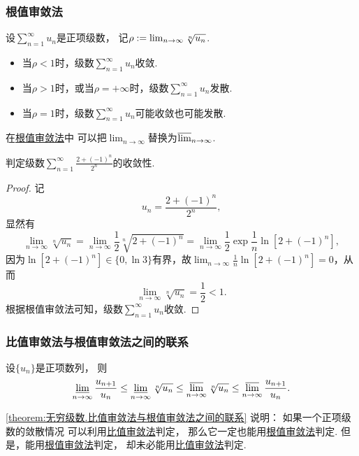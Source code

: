 \subsubsection{根值审敛法}
\begin{theorem}\label{theorem:无穷级数.正项级数的根值审敛法}
设\(\sum_{n=1}^\infty u_n\)是正项级数，
记\(\rho := \lim_{n\to\infty} \sqrt[n]{u_n}\).
\begin{itemize}
	\item 当\(\rho<1\)时，级数\(\sum_{n=1}^\infty u_n\)收敛.
	\item 当\(\rho>1\)时，或当\(\rho=+\infty\)时，级数\(\sum_{n=1}^\infty u_n\)发散.
	\item 当\(\rho=1\)时，级数\(\sum_{n=1}^\infty u_n\)可能收敛也可能发散.
\end{itemize}
\end{theorem}
在\hyperref[theorem:无穷级数.正项级数的根值审敛法]{根值审敛法}中
可以把\(\lim_{n\to\infty}\)替换为\(\varlimsup_{n\to\infty}\).

\begin{example}
判定级数\(\sum_{n=1}^\infty \frac{2+(-1)^n}{2^n}\)的收敛性.
\begin{proof}
记\[
u_n = \frac{2+(-1)^n}{2^n},
\]显然有\[
\lim_{n\to\infty} \sqrt[n]{u_n}
= \lim_{n\to\infty} \frac{1}{2} \sqrt[n]{2+(-1)^n}
= \lim_{n\to\infty} \frac{1}{2} \exp{\frac{1}{n} \ln[2+(-1)^n]},
\]因为\(\ln[2+(-1)^n] \in \{ 0, \ln3 \}\)有界，故\(\lim_{n\to\infty} \frac{1}{n} \ln[2+(-1)^n] = 0\)，从而\[
\lim_{n\to\infty} \sqrt[n]{u_n} = \frac{1}{2} < 1.
\]根据根值审敛法可知，级数\(\sum_{n=1}^\infty u_n\)收敛.
\end{proof}
\end{example}

\subsubsection{比值审敛法与根值审敛法之间的联系}
\begin{theorem}\label{theorem:无穷级数.比值审敛法与根值审敛法之间的联系}
设\(\{u_n\}\)是正项数列，
则\[
	\varliminf_{n\to\infty} \frac{u_{n+1}}{u_n}
	\leq
	\varliminf_{n\to\infty} \sqrt[n]{u_n}
	\leq
	\varlimsup_{n\to\infty} \sqrt[n]{u_n}
	\leq
	\varlimsup_{n\to\infty} \frac{u_{n+1}}{u_n}.
\]
\end{theorem}
\begin{remark}
\cref{theorem:无穷级数.比值审敛法与根值审敛法之间的联系} 说明：
如果一个正项级数的敛散情况
可以利用\hyperref[theorem:无穷级数.正项级数的比值审敛法]{比值审敛法}判定，
那么它一定也能用\hyperref[theorem:无穷级数.正项级数的根值审敛法]{根值审敛法}判定.
但是，能用\hyperref[theorem:无穷级数.正项级数的根值审敛法]{根值审敛法}判定，
却未必能用\hyperref[theorem:无穷级数.正项级数的比值审敛法]{比值审敛法}判定.
\end{remark}

